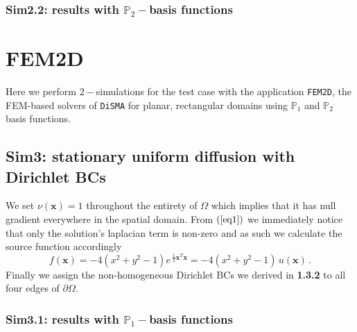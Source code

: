 \documentclass[12pt,openany,twoside,a4paper]{article}
\newcommand{\code}[1]{\colorbox{light-gray}{\texttt{#1}}}
\begin{document}
\subsubsection{Sim2.2: results with $\mathbb{P}_2-$basis functions}

\newpage
\section{FEM2D}
Here we perform $2-$simulations for the test case with the application \code{FEM2D}, the FEM-based solvers of \code{DiSMA} for planar, rectangular domains using $\mathbb{P}_1$ and $\mathbb{P}_2$ basis functions.
\subsection{Sim3: stationary uniform diffusion with Dirichlet BCs}
We set $\nu(\mathbf{x}) = 1$ throughout the entirety of $\Omega$ which implies that it has null gradient everywhere in the spatial domain. From $(\ref{eq1})$ we immediately notice that only the solution's laplacian term is non-zero and as such we calculate the source function accordingly
\begin{equation*}
    f(\mathbf{x}) = -4(x^2 + y^2 -1)e^{\:\frac{1}{2}\mathbf{x}^T\mathbf{x}} = -4(x^2 + y^2 -1)\,u(\mathbf{x}) \,.
\end{equation*}
Finally we assign the non-homogeneous Dirichlet BCs we derived in \textbf{1.3.2} to all four edges of $\partial\Omega$.

\subsubsection{Sim3.1: results with $\mathbb{P}_1-$basis functions}
\end{document}

